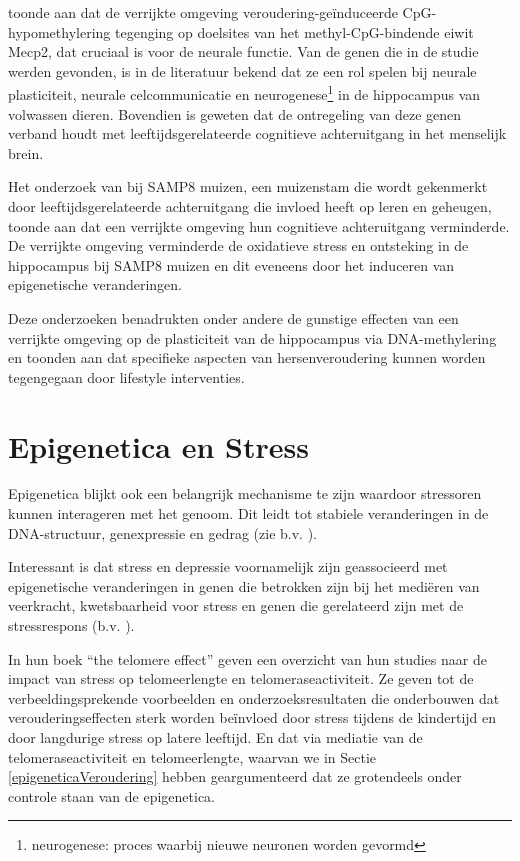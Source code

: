 \documentclass[
  11pt,
]{book}
\begin{document}
\citet{zocher2021} toonde aan dat de verrijkte omgeving veroudering-geïnduceerde CpG-hypomethylering tegenging op doelsites van het methyl-CpG-bindende eiwit Mecp2, dat cruciaal is voor de neurale functie. Van de genen die in de studie werden gevonden, is in de literatuur bekend dat ze een rol spelen bij neurale plasticiteit, neurale celcommunicatie en neurogenese\footnote{neurogenese: proces waarbij nieuwe neuronen worden gevormd} in de hippocampus van volwassen dieren. Bovendien is geweten dat de ontregeling van deze genen verband houdt met leeftijdsgerelateerde cognitieve achteruitgang in het menselijk brein.

Het onderzoek van \citet{grinan2016} bij SAMP8 muizen, een muizenstam die wordt gekenmerkt door leeftijdsgerelateerde achteruitgang die invloed heeft op leren en geheugen, toonde aan dat een verrijkte omgeving hun cognitieve achteruitgang verminderde. De verrijkte omgeving verminderde de oxidatieve stress en ontsteking in de hippocampus bij SAMP8 muizen en dit eveneens door het induceren van epigenetische veranderingen.

Deze onderzoeken benadrukten onder andere de gunstige effecten van een verrijkte omgeving op de plasticiteit van de hippocampus via DNA-methylering en toonden aan dat specifieke aspecten van hersenveroudering kunnen worden tegengegaan door lifestyle interventies.

\hypertarget{epigenetica-en-stress}{%
\section{Epigenetica en Stress}\label{epigenetica-en-stress}}

Epigenetica blijkt ook een belangrijk mechanisme te zijn waardoor stressoren kunnen interageren met het genoom. Dit leidt tot stabiele veranderingen in de DNA-structuur, genexpressie en gedrag (zie b.v. \citet{Park2019}).

Interessant is dat stress en depressie voornamelijk zijn geassocieerd met epigenetische veranderingen in genen die betrokken zijn bij het mediëren van veerkracht, kwetsbaarheid voor stress en genen die gerelateerd zijn met de stressrespons (b.v. \citet{Park2019}).

In hun boek ``the telomere effect'' geven \citet{BlackburnEpel2017} een overzicht van hun studies naar de impact van stress op telomeerlengte en telomeraseactiviteit. Ze geven tot de verbeeldingsprekende voorbeelden en onderzoeksresultaten die onderbouwen dat verouderingseffecten sterk worden beïnvloed door stress tijdens de kindertijd en door langdurige stress op latere leeftijd. En dat via mediatie van de telomeraseactiviteit en telomeerlengte, waarvan we in Sectie \ref{epigeneticaVeroudering} hebben geargumenteerd dat ze grotendeels onder controle staan van de epigenetica.
\end{document}
